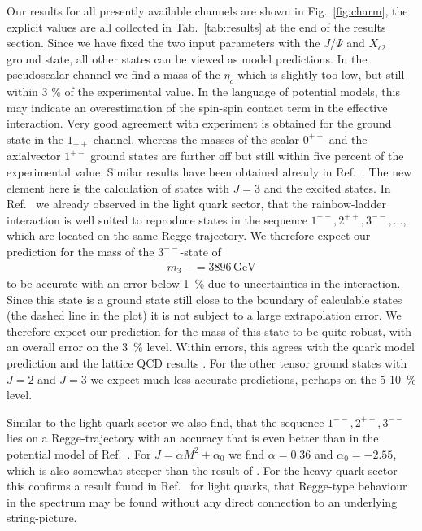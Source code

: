 Our results for all presently available channels are shown in Fig.~\ref{fig:charm},
the explicit values are all collected in Tab.~\ref{tab:results} at the end of the results section.
Since we have fixed the two input parameters with the $J/\Psi$ and $X_{c2}$ ground 
state, all other states can be viewed as model predictions. In the pseudoscalar channel
we find a mass of the $\eta_c$ which is slightly too low, but still within 3 \% of 
the experimental value. In the language of potential models, this may indicate an 
overestimation of the spin-spin contact term in the effective interaction. Very good 
agreement with experiment is obtained for the ground state in the $1_{++}$-channel, 
whereas the masses of
the scalar $0^{++}$ and the axialvector $1^{+-}$ ground states are further 
off but still within five percent of the experimental value. Similar results have
been obtained already in Ref.~\cite{Blank:2011ha,Hilger:2014nma}. The new element here is the
calculation of states with $J=3$ and the excited states. In Ref.~\cite{Fischer:2014xha}
we already observed in the light quark sector, that the rainbow-ladder interaction
is well suited to reproduce states in the sequence $1^{--}, 2^{++}, 3^{--},...$, which
are located on the same Regge-trajectory. We therefore expect our 
prediction for the mass of the $3^{--}$-state of 
%
\begin{align}
%
  m_{3^{--}}= 3896 \,\mbox{GeV}
%
\end{align}
%
to be accurate with an error below 1~\% due to uncertainties in the interaction.
Since this state is a ground state still close to the boundary of calculable states 
(the dashed line in the plot) it is not subject to a large extrapolation error. We 
therefore expect our prediction for the mass of this state to be quite robust, with 
an overall error on the 3~\% level. Within errors, this agrees with the quark model 
prediction \cite{Ebert:2011jc} and the lattice QCD results \cite{Bali:2011rd,Liu:2012ze}.
For the other tensor ground states with $J=2$ and $J=3$ we expect much less accurate 
predictions, perhaps on the 5-10~\% level. 

Similar to the light quark sector \cite{Fischer:2014xha} we also find, that the 
sequence $1^{--}, 2^{++}, 3^{--}$ lies on a Regge-trajectory with an accuracy that is
even better than in the potential model of Ref.~\cite{Ebert:2011jc}. 
For $J = \alpha M^2 + \alpha_0$ we find $\alpha = 0.36$ and $\alpha_0 = -2.55$, which 
is also somewhat steeper than the result of \cite{Ebert:2011jc}. For the heavy quark 
sector this confirms a result found in Ref.~\cite{Fischer:2014xha} for light quarks,
that Regge-type behaviour in the spectrum may be found without any direct connection 
to an underlying string-picture.

